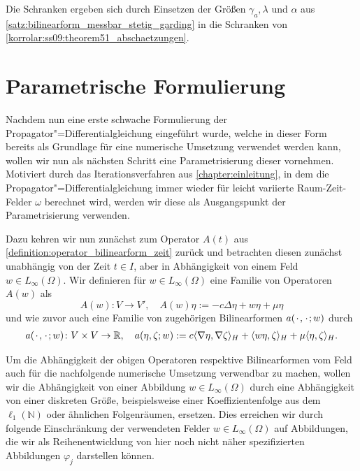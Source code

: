\begin{Korollar}
    \begin{Beweis}
        Die Schranken ergeben sich durch Einsetzen der Größen $\gamma_{a}, \lambda$ und $\alpha$ aus \cref{satz:bilinearform_messbar_stetig_garding} in die Schranken von \cref{korrolar:ss09:theorem51_abschaetzungen}.
    \end{Beweis}
\end{Korollar}


\section{Parametrische Formulierung} %
\label{section:parametrische_formulierung}

Nachdem nun eine erste schwache Formulierung der Propagator"=Differentialgleichung eingeführt wurde, welche in dieser Form bereits als Grundlage für eine numerische Umsetzung verwendet werden kann, wollen wir nun als nächsten Schritt eine Parametrisierung dieser vornehmen.
Motiviert durch das Iterationsverfahren aus \cref{chapter:einleitung}, in dem die Propagator"=Differentialgleichung immer wieder für leicht variierte Raum-Zeit-Felder $\omega$ berechnet wird, werden wir diese als Ausgangspunkt der Parametrisierung verwenden.

Dazu kehren wir nun zunächst zum Operator $A(t)$ aus \cref{definition:operator_bilinearform_zeit} zurück und betrachten diesen zunächst unabhängig von der Zeit $t \in I$, aber in Abhängigkeit von einem Feld $w \in L_{\infty}(\Omega)$.
Wir definieren für $w \in L_{\infty}(\Omega)$ eine Familie von Operatoren $A(w)$ als
\begin{equation}
    \label{eq:operator_feld}
    A(w) \colon V \to V', \quad A(w) \eta := - c \Delta \eta + w \eta + \mu \eta
\end{equation}
und wie zuvor auch eine Familie von zugehörigen Bilinearformen $a({\mkern2mu\cdot\mkern2mu}, {\mkern2mu\cdot\mkern2mu}; w)$ durch
\begin{equation}
    \label{eq:bilinearform_feld}
    \begin{aligned}
        a({\mkern2mu\cdot\mkern2mu}, {\mkern2mu\cdot\mkern2mu}; w) \colon V \times V \to \mathbb{R}, \quad
        a(\eta, \zeta; w) := c\langle\nabla \eta,\nabla \zeta\rangle_{H} + \langle w \eta,\zeta\rangle_{H} + \mu \langle\eta,\zeta\rangle_{H}.
    \end{aligned}
\end{equation}

Um die Abhängigkeit der obigen Operatoren respektive Bilinearformen vom Feld auch für die nachfolgende numerische Umsetzung verwendbar zu machen, wollen wir die Abhängigkeit von einer Abbildung $w \in L_{\infty}(\Omega)$ durch eine Abhängigkeit von einer diskreten Größe, beispielsweise einer Koeffizientenfolge aus dem $\ell_{1}(\mathbb{N})$ oder ähnlichen Folgenräumen, ersetzen.
Dies erreichen wir durch folgende Einschränkung der verwendeten Felder $w \in L_{\infty}(\Omega)$ auf Abbildungen, die wir als Reihenentwicklung von hier noch nicht näher spezifizierten Abbildungen $\varphi_{j}$ darstellen können.

